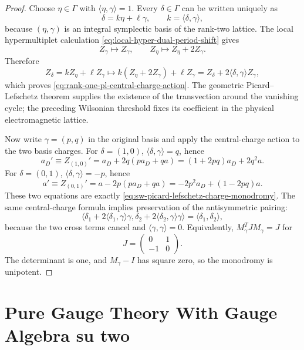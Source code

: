 \begin{proof}
Choose \(\eta\in\Gamma\) with \(\langle\eta,\gamma\rangle=1\).  Every
\(\delta\in\Gamma\) can be written uniquely as
\[
  \delta=k\eta+\ell\gamma,\qquad k=\langle\delta,\gamma\rangle ,
\]
because \((\eta,\gamma)\) is an integral symplectic basis of the rank-two
lattice.  The local hypermultiplet calculation
\eqref{eq:local-hyper-dual-period-shift} gives
\[
  Z_\gamma\longmapsto Z_\gamma,\qquad
  Z_\eta\longmapsto Z_\eta+2Z_\gamma .
\]
Therefore
\[
  Z_\delta=kZ_\eta+\ell Z_\gamma
  \longmapsto
  k(Z_\eta+2Z_\gamma)+\ell Z_\gamma
  =
  Z_\delta+2\langle\delta,\gamma\rangle Z_\gamma ,
\]
which proves \eqref{eq:rank-one-pl-central-charge-action}.  The geometric
Picard--Lefschetz theorem supplies the existence of the transvection around
the vanishing cycle; the preceding Wilsonian threshold fixes its coefficient
in the physical electromagnetic lattice.

Now write \(\gamma=(p,q)\) in the original basis and apply the central-charge
action to the two basis charges.  For \(\delta=(1,0)\),
\(\langle\delta,\gamma\rangle=q\), hence
\[
  a_D'\equiv Z_{(1,0)}'
  =
  a_D+2q(pa_D+qa)
  =
  (1+2pq)a_D+2q^2a .
\]
For \(\delta=(0,1)\), \(\langle\delta,\gamma\rangle=-p\), hence
\[
  a'\equiv Z_{(0,1)}'
  =
  a-2p(pa_D+qa)
  =
  -2p^2a_D+(1-2pq)a .
\]
These two equations are exactly \eqref{eq:sw-picard-lefschetz-charge-monodromy}.
The same central-charge formula implies preservation of the antisymmetric
pairing:
\[
  \langle\delta_1+2\langle\delta_1,\gamma\rangle\gamma,
          \delta_2+2\langle\delta_2,\gamma\rangle\gamma\rangle
  =
  \langle\delta_1,\delta_2\rangle,
\]
because the two cross terms cancel and
\(\langle\gamma,\gamma\rangle=0\).  Equivalently,
\(M_\gamma^T J M_\gamma=J\) for
\[
  J=\begin{pmatrix}0&1\\ -1&0\end{pmatrix}.
\]
The determinant is one, and \(M_\gamma-I\) has square zero, so the monodromy
is unipotent.
\end{proof}

\section{Pure Gauge Theory With Gauge Algebra su two}

